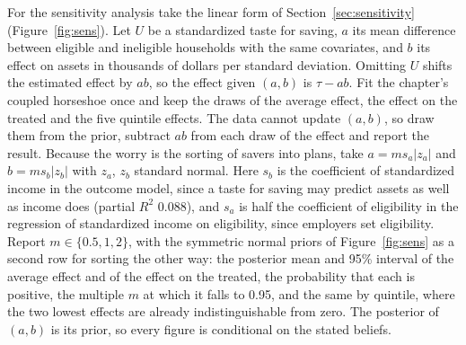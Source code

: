 For the sensitivity analysis take the linear form of Section~\ref{sec:sensitivity} (Figure~\ref{fig:sens}). Let $U$ be a standardized taste for saving, $a$ its mean difference between eligible and ineligible households with the same covariates, and $b$ its effect on assets in thousands of dollars per standard deviation. Omitting $U$ shifts the estimated effect by $ab$, so the effect given $(a, b)$ is $\tau - ab$. Fit the chapter's coupled horseshoe once and keep the draws of the average effect, the effect on the treated and the five quintile effects. The data cannot update $(a, b)$, so draw them from the prior, subtract $ab$ from each draw of the effect and report the result. Because the worry is the sorting of savers into plans, take $a = m s_a |z_a|$ and $b = m s_b |z_b|$ with $z_a$, $z_b$ standard normal. Here $s_b$ is the coefficient of standardized income in the outcome model, since a taste for saving may predict assets as well as income does (partial $R^2$ 0.088), and $s_a$ is half the coefficient of eligibility in the regression of standardized income on eligibility, since employers set eligibility. Report $m \in \{0.5, 1, 2\}$, with the symmetric normal priors of Figure~\ref{fig:sens} as a second row for sorting the other way: the posterior mean and 95\% interval of the average effect and of the effect on the treated, the probability that each is positive, the multiple $m$ at which it falls to 0.95, and the same by quintile, where the two lowest effects are already indistinguishable from zero. The posterior of $(a, b)$ is its prior, so every figure is conditional on the stated beliefs.

